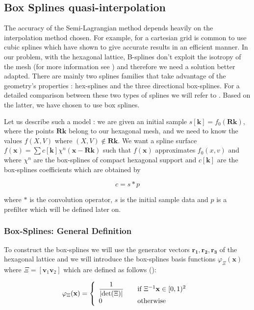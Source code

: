 \documentclass[proc]{edpsmath}
\begin{document}
\subsection{Box Splines quasi-interpolation}

The accuracy of the Semi-Lagrangian method depends heavily on the interpolation method chosen. For example, for a cartesian grid is common to use cubic splines which have shown to give accurate results in an efficient manner. In our problem, with the hexagonal lattice, B-splines don't exploit the isotropy of the mesh (for more information see \cite{Mersereau79-IEEE}) and therefore we need a solution better adapted.  There are mainly two splines families that take advantage of the geometry's properties : hex-splines and the three directional box-splines. For a detailed comparison between these two types of splines we will refer to \cite{Condat2007}. Based on the latter, we have chosen to use box splines.

Let us describe such a model : we are given an initial sample $s[\mathbf{k}] = f_0(\mathbf{R} \mathbf{k})$, where the points $\mathbf{R} \mathbf{k}$ belong to our hexagonal mesh, and we need to know the values $f(X,V)$ where $(X,V) \notin \mathbf{R} \mathbf{k}$. We want a spline surface $f(\mathbf{x}) = \sum c[\mathbf{k}] \chi^n(\mathbf{x} - \mathbf{R}\mathbf{k})$ such that $f(\mathbf{x})$ approximates $f_0(x,v)$ and where $\chi^n$ are the box-splines of compact hexagonal support and $c[\mathbf{k}]$ are the box-splines coefficients which are obtained by \cite{Condat2006a}

\begin{equation}
\label{eqn:coefs}
 c = s * p
\end{equation}

where $*$ is the convolution operator, $s$ is the initial sample data and $p$ is a prefilter which will be defined later on.

\subsubsection{Box-Splines: General Definition}
To construct the box-splines we will use the generator vectors $\mathbf{r_1, r_2, r_3}$ of the hexagonal lattice and we will introduce the box-splines basis functions $\varphi_{\Xi}(\mathbf{x})$ where $\Xi = [\mathbf{v}_1 \mathbf{v}_2]$ which are defined as follows (\cite{Condat2006, Boor1993}):

\begin{equation}
	\varphi_{\Xi} (\mathbf{x}) = \left\{
  	\begin{array}{l l}
    \dfrac{1}{\lvert \det(\Xi)\rvert} & \quad \text{if $\Xi^{-1}\mathbf{x} \in [0,1)^2$ }\\
    0 & \quad \text{otherwise}
  	\end{array} \right.
\end{equation}
\end{document}
